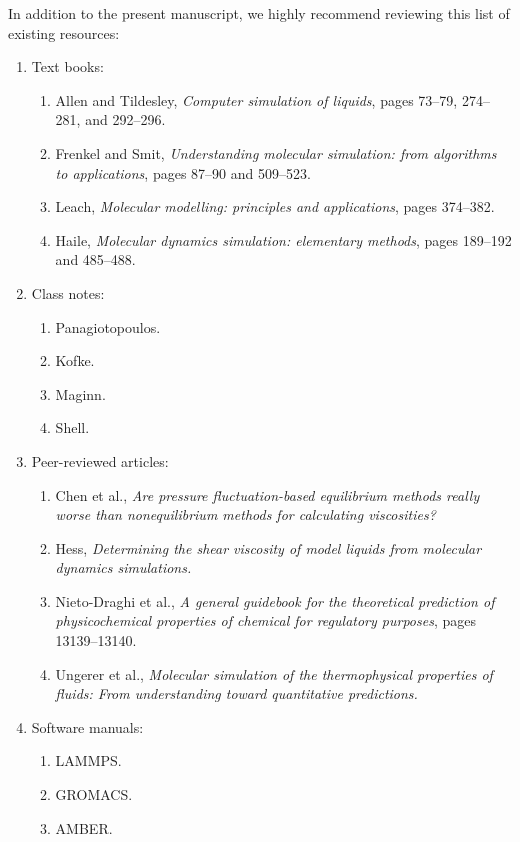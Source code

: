 \documentclass[9pt,bestpractices]{livecoms}
\begin{document}
In addition to the present manuscript, we highly recommend reviewing this list of existing resources:
\begin{enumerate}
	\item Text books:
	\begin{enumerate}
		\item Allen and Tildesley, \textit{Computer simulation of liquids}, pages 73--79, 274--281, and 292--296. \cite{Allen2017}
		\item Frenkel and Smit, \textit{Understanding molecular simulation: from algorithms to applications}, pages 87--90 and 509--523. \cite{Frenkel2002}
		\item Leach, \textit{Molecular modelling: principles and applications}, pages 374--382. \cite{Leach2001}
		\item Haile, \textit{Molecular dynamics simulation: elementary methods}, pages 189--192 and 485--488. \cite{Haile1992}
	\end{enumerate}
	\item Class notes:
	\begin{enumerate}
		\item Panagiotopoulos. \cite{PanaNotes}
		\item Kofke. \cite{KofkeNotes}
		\item Maginn. \cite{MaginnNotes}
		\item Shell. \cite{ShellNotes}
	\end{enumerate}
    \vfill\null
	\item Peer-reviewed articles:
	\begin{enumerate}
		\item Chen et al., \textit{Are pressure fluctuation-based equilibrium methods really worse than nonequilibrium methods for calculating viscosities?} \cite{Chen2009}
		\item Hess, \textit{Determining the shear viscosity of model liquids from molecular dynamics simulations.} \cite{Hess2002}
		\item Nieto-Draghi et al., \textit{A general guidebook for the theoretical prediction of physicochemical properties of chemical for regulatory purposes}, pages 13139--13140. \cite{Nieto2015}
		\item Ungerer et al., \textit{Molecular simulation of the thermophysical properties of fluids: From understanding toward quantitative predictions.} \cite{Ungerer2007}
	\end{enumerate}
	\item Software manuals:
	\begin{enumerate}
		\item LAMMPS. \cite{LAMMPS}
		\item GROMACS. \cite{GROMACS}
		\item AMBER. \cite{AMBER2018}
	\end{enumerate}
\end{enumerate}
\end{document}
